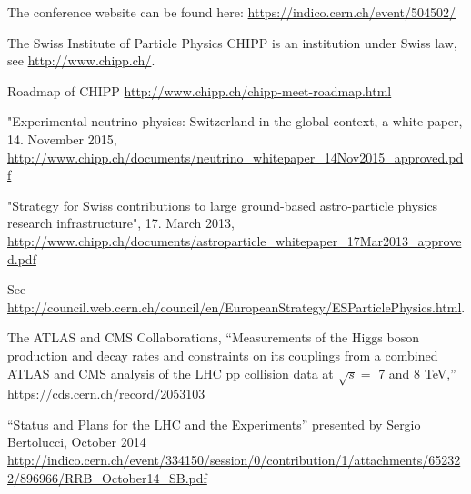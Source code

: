 \singlespacing

\begin{thebibliography}{100}
 The conference website can be found here: \url{https://indico.cern.ch/event/504502/}

 The Swiss Institute of Particle Physics CHIPP is an institution under Swiss law, see \url{http://www.chipp.ch/}.

  Roadmap of CHIPP \url{http://www.chipp.ch/chipp-meet-roadmap.html}


  "Experimental neutrino physics: Switzerland in the global context, a white paper, 14. November 2015, 
\url{http://www.chipp.ch/documents/neutrino_whitepaper_14Nov2015_approved.pdf}

 "Strategy for Swiss contributions to large ground-based astro-particle physics research infrastructure", 17. March 2013, 
\url{http://www.chipp.ch/documents/astroparticle_whitepaper_17Mar2013_approved.pdf}

 See \url{http://council.web.cern.ch/council/en/EuropeanStrategy/ESParticlePhysics.html}.

The ATLAS and CMS Collaborations,
  ``Measurements of the Higgs boson production and decay rates and constraints on its couplings from a combined ATLAS and CMS analysis of the LHC pp collision data at $\sqrt{s} =$ 7 and 8 TeV,''
  \url{https://cds.cern.ch/record/2053103}

 ``Status and Plans for the LHC and the Experiments'' presented by Sergio Bertolucci, October 2014\\
\url{http://indico.cern.ch/event/334150/session/0/contribution/1/attachments/652322/896966/RRB_October14_SB.pdf}

\end{thebibliography}
\newpage{\pagestyle{empty}\cleardoublepage}

